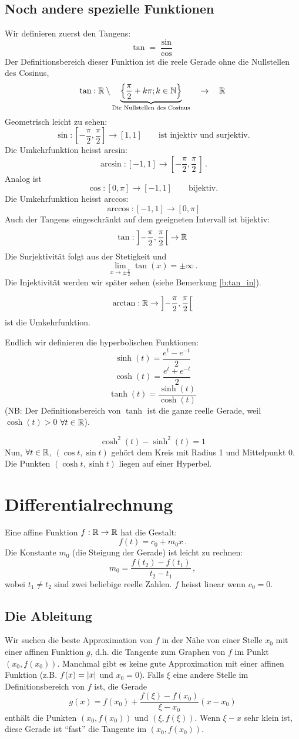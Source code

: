\subsection{Noch andere spezielle Funktionen}
Wir definieren zuerst den Tangens:
\[\tan=\frac{\sin}{\cos}\]
Der Definitionsbereich dieser Funktion ist die reele Gerade ohne die Nullstellen des Cosinus,
\[\tan :\mathbb{R}\setminus\underbrace{\left\{ \frac{\pi}{2}+k\pi; k\in\mathbb{N} \right\}}
_{\text{Die Nullstellen des Cosinus}}\quad\to\quad\mathbb{R}\]
Geometrisch leicht zu sehen: 
\[\sin:\left[ -\frac{\pi}{2},\frac{\pi}{2} \right]\to\left[ 1,1 \right]
\qquad \mbox{ist injektiv und surjektiv.}\]
 Die Umkehrfunktion heisst arcsin:
\[\arcsin:\left[ -1,1 \right]\to\left[ -\frac{\pi}{2},\frac{\pi}{2}\,  \right]\, .\]
Analog ist
\[\cos:\left[ 0,\pi \right]\to\left[ -1,1 \right]\qquad \mbox{bijektiv.}\]
Die Umkehrfunktion heisst arccos:
\[\arccos:\left[ -1,1 \right]\to\left[ 0,\pi \right]\]
Auch der Tangens eingeschr\"ankt auf dem geeigneten Intervall ist bijektiv:
  \[\tan:\left] -\frac{\pi}{2},\frac{\pi}{2} \right[\to\mathbb{R}\]
Die Surjektivit\"at folgt aus der Stetigkeit 
und  
\[\lim_{x\to\pm\frac{\pi}{2}}\tan(x)=\pm\infty\, .\]
Die Injektivität werden wir später sehen (siehe Bemerkung \ref{b:tan_in}).

\[\arctan:\mathbb{R}\to\left] -\frac{\pi}{2},\frac{\pi}{2} \right[\]
ist die Umkehrfunktion.

Endlich wir definieren die hyperbolischen Funktionen:
\[\sinh(t)=\frac{e^t-e^{-t}}{2}\]
\[\cosh(t)=\frac{e^t+e^{-t}}{2}\]
\[\tanh(t)=\frac{\sinh (t)}{\cosh (t)}\]
(NB: Der Definitionsbereich von $\tanh$ ist die ganze reelle Gerade,
weil $\cosh (t)>0$ $\forall t\in \mathbb{R}$).
\begin{Bem}
  \[\cosh^2(t)-\sinh^2(t)=1\]
Nun, $\forall t\in\mathbb{R}$, $\left( \cos t, \sin t \right)$ geh\"ort dem Kreis mit Radius 1 und Mittelpunkt 0.
Die Punkten $\left( \cosh t, \sinh t \right)$ liegen auf einer Hyperbel.
\end{Bem}
\section{Differentialrechnung}
Eine affine Funktion $f:\mathbb{R}\to\mathbb{R}$ hat die Gestalt:
\[f(t)=c_0+m_0x\, .\]
Die Konstante $m_0$ (die Steigung der Gerade) ist leicht zu rechnen:
\[m_0=\frac{f(t_2)-f(t_1)}{t_2-t_1}\, ,\]
wobei $t_1\neq t_2$ sind zwei beliebige reelle Zahlen.
$f$ heisst linear wenn $c_0=0$.
\subsection{Die Ableitung}
Wir suchen
die beste Approximation von $f$ in der Nähe von einer Stelle $x_0$ 
mit einer affinen Funktion $g$, d.h. die Tangente zum Graphen von $f$
im Punkt $(x_0, f(x_0))$. Manchmal gibt es keine gute
Approximation mit einer affinen Funktion (z.B.
$f(x)=\mathopen| x \mathclose|$ und $x_0=0$). Falls $\xi$ eine andere Stelle im
Definitionsbereich von $f$ ist, die Gerade 
\[
 g(x) = f (x_0) + \frac{f(\xi)-f(x_0)}{\xi- x_0} (x-x_0)
\]
enth\"alt die Punkten $(x_0, f(x_0))$ und $(\xi, f(\xi))$. 
Wenn $\xi-x$ sehr klein ist, diese Gerade ist ``fast'' die Tangente
im $(x_0, f(x_0))$.

